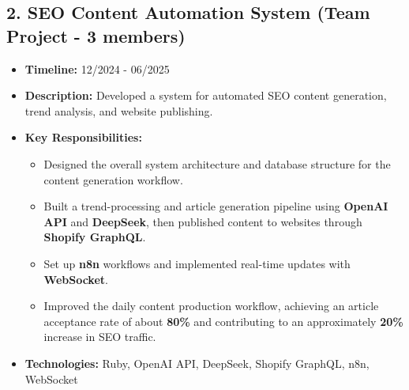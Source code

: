 \documentclass[a4paper,10pt]{article}
\begin{document}
\subsection*{2. SEO Content Automation System \hfill \small (Team Project - 3 members)}
\begin{itemize}
    \item \textbf{Timeline:} 12/2024 - 06/2025
    \item \textbf{Description:} Developed a system for automated SEO content generation, trend analysis, and website publishing.
    \item \textbf{Key Responsibilities:}
    \begin{itemize}
        \item Designed the overall system architecture and database structure for the content generation workflow.
        \item Built a trend-processing and article generation pipeline using \textbf{OpenAI API} and \textbf{DeepSeek}, then published content to websites through \textbf{Shopify GraphQL}.
        \item Set up \textbf{n8n} workflows and implemented real-time updates with \textbf{WebSocket}.
        \item Improved the daily content production workflow, achieving an article acceptance rate of about \textbf{80\%} and contributing to an approximately \textbf{20\%} increase in SEO traffic.
    \end{itemize}
    \item \textbf{Technologies:} Ruby, OpenAI API, DeepSeek, Shopify GraphQL, n8n, WebSocket
\end{itemize}
\end{document}
